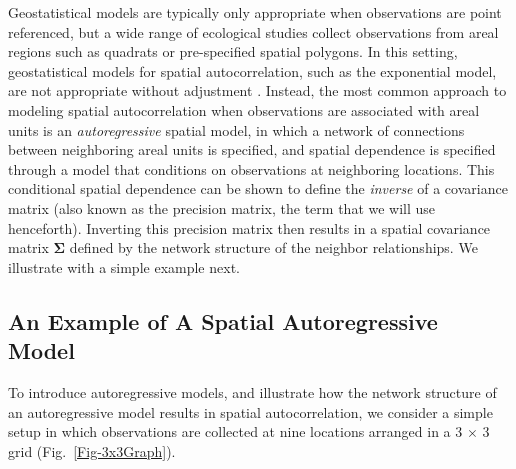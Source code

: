 \documentclass[11pt, titlepage]{article}\usepackage[]{graphicx}\usepackage[]{color}
\begin{document}
\begin{spacing}{1.9}
\begin{flushleft}
Geostatistical models are typically only appropriate when observations are point referenced, but a wide range of ecological studies collect observations from areal regions such as quadrats or pre-specified spatial polygons.  In this setting, geostatistical models for spatial autocorrelation, such as the exponential model, are not appropriate without adjustment \citep[but see ][]{Gotw:Youn:comb:2002}.  Instead, the most common approach to modeling spatial autocorrelation when observations are associated with areal units is an \emph{autoregressive} spatial model, in which a network of connections between neighboring areal units is specified, and spatial dependence is specified through a model that conditions on observations at neighboring locations.  This conditional spatial dependence can be shown to define the \emph{inverse} of a covariance matrix (also known as the precision matrix, the term that we will use henceforth).  Inverting this precision matrix then results in a spatial covariance matrix $\boldsymbol\Sigma$ defined by the network structure of the neighbor relationships. We illustrate with a simple example next.   

\subsection*{An Example of A Spatial Autoregressive Model}


To introduce autoregressive models, and illustrate how the network structure of an autoregressive model results in spatial autocorrelation, we consider a simple setup in which observations are collected at nine locations arranged in a 3 $\times$ 3 grid (Fig.~\ref{Fig-3x3Graph}).



\end{flushleft}
\end{spacing}
\end{document}
